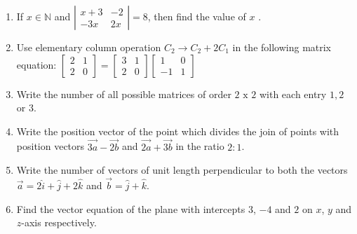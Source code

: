 \documentclass[a4paper,12pt]{article}
\begin{document}
\begin{enumerate}[label=\textbf{\arabic*.}]
	\item If $x \in \mathbb{N}$ and
		$	
		\left|
		\begin{array}{cc}x + 3 & -2 \\-3x & 2x
		\end{array}
		\right| = 8
		$, \quad then find the value of $x$ .
	\vspace{0.5em}
	\item Use elementary column operation $C_2		\rightarrow C_2 + 2C_1$ in the following matrix equation:
		$ 
		\begin{bmatrix}
			2 & 1 \\2 & 0 
		\end{bmatrix}
		=
		\begin{bmatrix}
			3 & 1 \\2 & 0
		\end{bmatrix}
		\begin{bmatrix}
			1 & 0 \\-1 & 1
		\end{bmatrix}
		$
	\vspace{0.5em}
	\item Write the number of all possible matrices of order $2 \text{ x } 2$ with each entry $1, 2$ or $3$.
	\vspace{0.5em}
	\item Write the position vector of the point which divides the join of points with position vectors $\vec{3a}- \vec{2b}$ and $\vec{2a} + \vec{3b}$ in the ratio $2 : 1$.
	\vspace{0.5em}
	\item Write the number of vectors of unit length perpendicular to both the vectors  $\vec{a} = 2\hat{i} + \hat{j} + 2\hat{k}$ and $\vec{b} = \hat{j} + \hat{k}$.
	\vspace{0.5em}
	\item Find the vector equation of the plane with intercepts $3$, $-4$ and $2$ on $x$, $y$ and $z$-axis respectively.
	\vspace{0.5em}
\newpage
\thispagestyle{plain}
\begin{center}

\end{center}
\end{enumerate}
\end{document}
